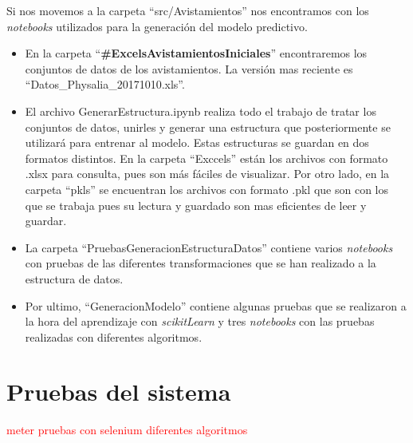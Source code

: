 Si nos movemos a la carpeta ``src/Avistamientos'' nos encontramos con los \emph{notebooks} utilizados para la generación del modelo predictivo.
\begin{itemize}
	\item En la carpeta ``\textbf{\#ExcelsAvistamientosIniciales}'' encontraremos los conjuntos de datos de los avistamientos. La versión mas reciente es ``Datos\_Physalia\_20171010.xls''.
	\item El archivo GenerarEstructura.ipynb realiza todo el trabajo de tratar los conjuntos de datos, unirles y generar una estructura que posteriormente se utilizará para entrenar al modelo. Estas estructuras se guardan en dos formatos distintos. En la carpeta ``Exccels'' están los archivos con formato .xlsx para consulta, pues son más fáciles de visualizar. Por otro lado, en la carpeta ``pkls'' se encuentran los archivos con formato .pkl que son con los que se trabaja pues su lectura y guardado son mas eficientes de leer y guardar.
	\item La carpeta ``PruebasGeneracionEstructuraDatos'' contiene varios \emph{notebooks} con pruebas de las diferentes transformaciones que se han realizado a la estructura de datos. 
	\item Por ultimo, ``GeneracionModelo'' contiene algunas pruebas que se realizaron a la hora del aprendizaje con \emph{scikitLearn} y tres \emph{notebooks} con las  pruebas realizadas con diferentes algoritmos.
\end{itemize}

\section{Pruebas del sistema}

\textcolor{red}{meter pruebas con selenium}
\textcolor{red}{diferentes algoritmos}


